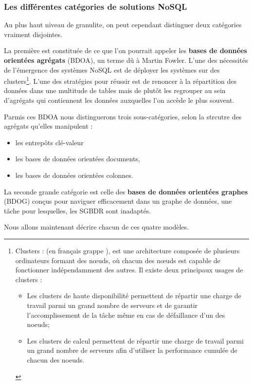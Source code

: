 \documentclass[12pt]{article}
\begin{document}
\subsubsection{Les différentes catégories de solutions NoSQL}
Au plus haut niveau de granulite, on peut cependant distinguer deux catégories vraiment disjointes. \par
La première est constituée de ce que l'on pourrait appeler les \textbf{bases de données orientées agrégats} (BDOA), un terme dû à Martin Fowler. L'une des nécessités de l'émergence des systèmes NoSQL est de déployer les systèmes sur des clusters\footnote{Clusters : (en français \og grappe \fg),  est une architecture composée de plusieurs ordinateurs formant des nœuds, où chacun des nœuds est capable de fonctionner indépendamment des autres. Il existe deux principaux usages de clusters : 
\begin{itemize}
\item Les clusters de haute disponibilité permettent de répartir une charge de travail parmi un grand nombre de serveurs et de garantir l'accomplissement de la tâche même en cas de défaillance d'un des noeuds;
\item Les clusters de calcul permettent de répartir une charge de travail parmi un grand nombre de serveurs afin d'utiliser la performance cumulée de chacun des noeuds.
\end{itemize}}. L'une des stratégies pour réussir est de renoncer à la répartition des données dans une multitude de tables mais de plutôt les regrouper au sein d'agrégats qui contiennent les données auxquelles l'on accède le plus souvent. \par
Parmis ces BDOA nous distinguerons trois sous-catégories, selon la strcutre des agrégats qu'elles manipulent : 
\begin{itemize}
\item les entrepôts clé-valeur
\item les bases de données orientées documents,
\item les bases de données orientées colonnes.
\end{itemize}
\vspace{0.4cm}
La seconde grande catégorie est celle des \textbf{bases de données orientées graphes} (BDOG) conçus pour naviguer efficacement dans un graphe de données, une tâche pour lesquelles, les SGBDR sont inadaptés.
\par
Nous allons maintenant décrire chacun de ces quatre modèles.
\end{document}
